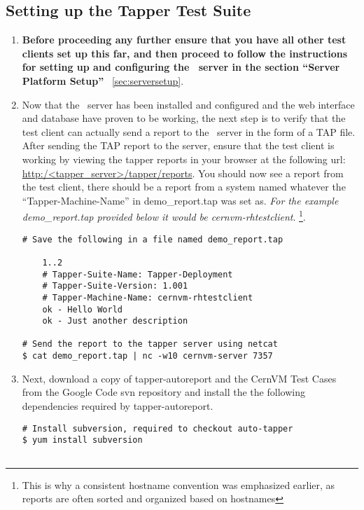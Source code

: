 \subsection{Setting up the Tapper Test Suite}
\label{sec:rhtestsuite}
\begin{enumerate}
\item 	{\bf Before proceeding any further ensure that you have all other test clients set up this far, and then proceed
		to follow the instructions for setting up and configuring the \tapper~server in the section ``Server Platform Setup''}		
		~\ref{sec:serversetup}.
		
\item 	Now that the \tapper~server has been installed and configured and the \tapper web interface and database have proven
		to be working, the next step is to verify that the test client can actually send a report to the \tapper~server in
		the form of a TAP file. After sending the TAP report to the server, ensure that the test client is working by viewing 
		the tapper reports in your browser at the following url: \url{http:/<tapper\_server>/tapper/reports}. You should now see a 
		report from the test client, there should be a report from a system named whatever the ``Tapper-Machine-Name'' in 
		demo\_report.tap was set as. \emph{For the example demo\_report.tap provided below it would be cernvm-rhtestclient}.
		\footnote{This is why a consistent hostname convention was emphasized earlier, as reports are often sorted and organized 
		based on hostnames}.
		
\lstset{language=bash,caption=Send a Basic Report to the \tapper~Server}
\begin{lstlisting}
# Save the following in a file named demo_report.tap

	1..2
	# Tapper-Suite-Name: Tapper-Deployment
	# Tapper-Suite-Version: 1.001
	# Tapper-Machine-Name: cernvm-rhtestclient
	ok - Hello World
	ok - Just another description

# Send the report to the tapper server using netcat
$ cat demo_report.tap | nc -w10 cernvm-server 7357
\end{lstlisting}

\item 	Next, download a copy of tapper-autoreport and the CernVM Test Cases from the Google Code svn repository
		\cite{GCreleasetesting} and install the the following dependencies required by tapper-autoreport.
		
\lstset{language=bash,caption=Install \tapper~AutoReport and Dependencies}
\begin{lstlisting}
# Install subversion, required to checkout auto-tapper
$ yum install subversion


\end{lstlisting}
\end{enumerate}
